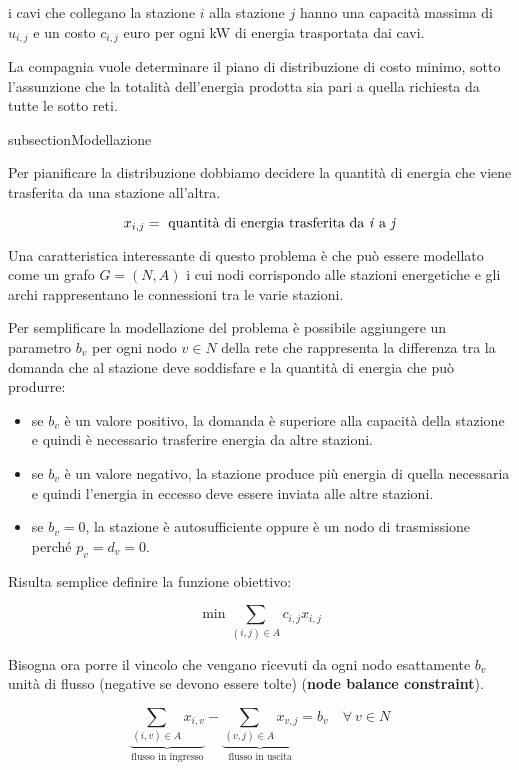\noindent i cavi che collegano la stazione $i$ alla stazione $j$ hanno una capacità massima di $u_{i,j}$ e un costo $c_{i,j}$ euro per ogni kW di energia trasportata dai cavi.

La compagnia vuole determinare il piano di distribuzione di costo minimo, sotto l'assunzione che la totalità dell'energia prodotta sia pari a quella richiesta da tutte le sotto reti.

subsection{Modellazione}

Per pianificare la distribuzione dobbiamo decidere la quantità di energia che viene trasferita da una stazione all'altra.

$$
x_{i,j} = \text{ quantità di energia trasferita da \textit{i} a \textit{j}}
$$

\noindent Una caratteristica interessante di questo problema è che può essere modellato come un grafo $G = (N,A)$ i cui nodi corrispondo alle stazioni energetiche e gli archi rappresentano le connessioni tra le varie stazioni.

Per semplificare la modellazione del problema è possibile aggiungere un parametro $b_v$ per ogni nodo $v \in N$ della rete che rappresenta la differenza tra la domanda che al stazione deve soddisfare e la quantità di energia che può produrre:

\begin{itemize}
	\item se $b_v$ è un valore positivo, la domanda è superiore alla capacità della stazione e quindi è necessario trasferire energia da altre stazioni.
	\item se $b_v$ è un valore negativo, la stazione produce più energia di quella necessaria e quindi l'energia in eccesso deve essere inviata alle altre stazioni.
	\item se $b_v = 0$, la stazione è autosufficiente oppure è un nodo di trasmissione perché $p_v = d_v = 0$.
\end{itemize}

\noindent Risulta semplice definire la funzione obiettivo:

$$
\min \sum\limits_{(i,j) \in A} c_{i,j} x_{i,j}
$$

\noindent Bisogna ora porre il vincolo che vengano ricevuti da ogni nodo esattamente $b_v$ unità di flusso (negative se devono essere tolte) (\textbf{node balance constraint}).

$$
\underbrace{\sum\limits_{(i,v) \in A} x_{i,v}}_{\text{flusso in ingresso}} - \underbrace{\sum\limits_{(v,j) \in A} x_{v,j}}_{\text{flusso in uscita}} = b_v \quad \forall \: v \in N
$$ 

